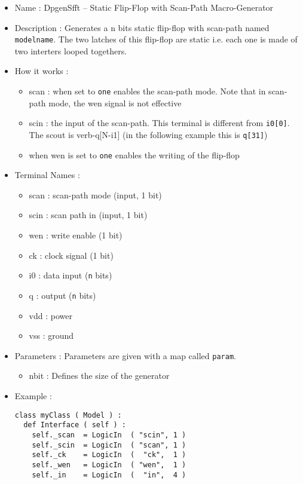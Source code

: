 \begin{itemize}
    \item Name : DpgenSfft -- Static Flip-Flop with Scan-Path Macro-Generator
    \item Description : Generates a n bits static flip-flop with scan-path named \verb-modelname-. The two latches of this flip-flop are static i.e. each one is made of two interters looped togethers.
    \item How it works : 
    \begin{itemize}
        \item scan : when set to \verb-one- enables the scan-path mode. Note that in scan-path mode, the wen signal is not effective
        \item scin : the input of the scan-path. This terminal is different from \verb-i0[0]-. The scout is verb-q[N-i1] (in the following example this is \verb-q[31]-)
        \item when wen is set to \verb-one- enables the writing of the flip-flop
    \end{itemize}
    \item Terminal Names :
    \begin{itemize}
        \item scan : scan-path mode (input, 1 bit)
        \item scin : scan path in (input, 1 bit)
        \item wen : write enable (1 bit)
        \item ck : clock signal (1 bit)
        \item i0 : data input (\verb-n- bits)
        \item q : output (\verb-n- bits)
        \item vdd : power
        \item vss : ground
    \end{itemize}
    \item Parameters : Parameters are given with a map called \verb-param-.
    \begin{itemize}
        \item nbit : Defines the size of the generator
    \end{itemize}
    \item Example :
\begin{verbatim}
class myClass ( Model ) :
  def Interface ( self ) :
    self._scan  = LogicIn  ( "scin", 1 )
    self._scin  = LogicIn  ( "scan", 1 )
    self._ck    = LogicIn  (  "ck",  1 )
    self._wen   = LogicIn  ( "wen",  1 )
    self._in    = LogicIn  (  "in",  4 )
    

\end{verbatim}
\end{itemize}
